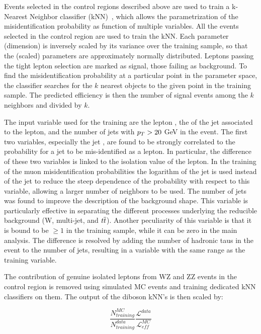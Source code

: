 Events selected in the control regions described above are used to train a k-Nearest Neighbor classifier (kNN)~\cite{TMVA}, which allows the parametrization of the misidentification probability as function of multiple variables. All the events selected in the control region are used to train the kNN.
Each parameter (dimension) is inversely scaled by its variance over the training sample, so that the (scaled) parameters are approximately normally distributed.
Leptons passing the tight lepton selection are marked as signal, those failing as background.
To find the misidentification probability at a particular point in the parameter space, the classifier searches for the $k$ nearest objects to the given point in the training sample.
The predicted efficiency is then the number of signal events among the $k$ neighbors and divided by $k$.

The input variable used for the training are the lepton \pT, the \pT of the jet associated to the lepton, and the number of jets with $p_{T} > 20$ GeV in the event. 
The first two variables, especially the jet \pT, are found to be strongly correlated to the probability for a jet to be mis-identified as a lepton. In particular, the difference of these two variables is linked to the isolation value of the lepton. In the training of the muon misidentification probabilities the logarithm of the jet \pT is used instead of the jet \pT to reduce the steep dependence of the probability with respect to this variable, allowing a larger number of neighbors to be used.
The number of jets was found to improve the description of the background shape. This variable is particularly effective in separating the different processes underlying the reducible background (W, multi-jet, and $t\overline{t}$). Another peculiarity of this variable is that it is bound to be $\geq 1$ in the training sample, while it can be zero in the main analysis. The difference is resolved by adding the number of hadronic taus in the event to the number of jets, resulting in a variable with the same range as the training variable.

The contribution of genuine isolated leptons from WZ and ZZ events in the control region is removed using simulated MC events and training dedicated kNN classifiers on them.
The output of the diboson kNN's is then scaled by:

\begin{equation}
\frac{N_{training}^{MC}}{N_{training}^{data}}\frac{\mathcal{L}^{data}}{\mathcal{L}_{eff}^{MC}}
\end{equation}

